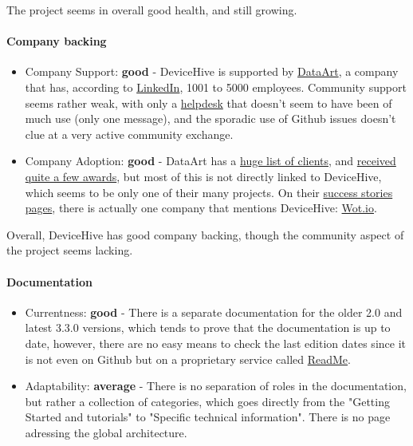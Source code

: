\documentclass{article}
\begin{document}
The project seems in overall good health, and still growing.

\paragraph{Company backing}

\begin{itemize}
\item Company Support: \textbf{good} - DeviceHive is supported by \href{http://www.dataart.com/}{DataArt}, a company that has, according to \href{https://www.linkedin.com/company/dataart}{LinkedIn}, 1001 to 5000 employees. Community support seems rather weak, with only a \href{https://docs.devicehive.com/discuss}{helpdesk} that doesn't seem to have been of much use (only one message), and the sporadic use of Github issues doesn't clue at a very active community exchange.
\item Company Adoption: \textbf{good} - DataArt has a \href{http://www.dataart.com/clients/select-clients}{huge list of clients}, and \href{http://www.dataart.com/about-dataart/industry-recognition}{received quite a few awards}, but most of this is not directly linked to DeviceHive, which seems to be only one of their many projects. On their \href{http://www.dataart.com/clients/success-stories}{success stories pages}, there is actually one company that mentions DeviceHive: \href{http://www.interdigital.com/solution/wotio}{Wot.io}.
\end{itemize}

Overall, DeviceHive has good company backing, though the community aspect of the project seems lacking.

\paragraph{Documentation}

\begin{itemize}
\item Currentness: \textbf{good} - There is a separate documentation for the older 2.0 and latest 3.3.0 versions, which tends to prove that the documentation is up to date, however, there are no easy means to check the last edition dates since it is not even on Github but on a proprietary service called \href{https://readme.io/}{ReadMe}.
\item Adaptability: \textbf{average} - There is no separation of roles in the documentation, but rather a collection of categories, which goes directly from the "Getting Started and tutorials" to "Specific technical information". There is no page adressing the global architecture.
\end{itemize}
\end{document}
